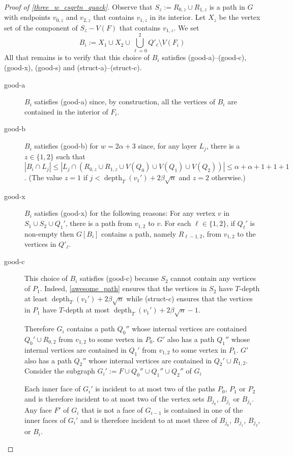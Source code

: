 \documentclass{patmorin}
\DeclareMathOperator{\depth}{depth}
\begin{document}
\begin{proof}[Proof of \cref{three_w_csqrtn_quack}]
  Observe that $S_{z} := R_{0,z}\cup R_{1,z}$ is a path in $G$ with endpoints $v_{0,z}$ and $v_{2,z}$ that contains $v_{1,z}$ in its interior.  Let $X_{z}$ be the vertex set of the component of $S_{z}-V(F)$ that contains $v_{1,z}$.
  We set
  \[
     B_i := X_{1} \cup X_{2} \cup \bigcup_{\ell=0}^2 Q'_\ell\setminus V(F_i)
  \]
  All that remains is to verify that this choice of $B_i$ satisfies (good-a)--(good-c), (good-x), (good-s) and (struct-a)--(struct-c).
  \begin{description}
    \item[good-a] $B_i$ satisfies (good-a) since, by construction, all the vertices of $B_i$ are contained in the interior of $F_i$.

    \item[good-b] $B_i$ satisfies (good-b) for $w=2\alpha+3$ since, for any layer $L_j$, there is a $z\in\{1,2\}$ such that $|B_i\cap L_j|\le |L_j\cap (R_{0,z}\cup R_{1,z}\cup V(Q_0)\cup V(Q_1)\cup V(Q_2))|\le \alpha+\alpha+1+1+1$.  (The value $z=1$ if $j < \depth_T(v_1')+2\beta\sqrt{n}$ and $z=2$ otherwise.)

    \item[good-x] $B_i$ satisfies (good-x) for the following reasons: For any vertex $v$ in $S_1\cup S_2\cup Q_1'$, there is a path from $v_{1,2}$ to $v$.  For each $\ell\in\{1,2\}$, if $Q_\ell'$ is non-empty then $G[B_i]$ contains a path, namely $R_{\ell-1,2}$, from $v_{1,2}$ to the vertices in $Q'_\ell$.

    \item[good-c] This choice of $B_i$ satisfies (good-c) because $S_{2}$ cannot contain any vertices of $P_1$. Indeed, \cref{awesome_path} ensures that the vertices in $S_2$ have $T$-depth at least $\depth_T(v_1')+ 2\beta\sqrt{n}$ while (struct-c) ensures that the vertices in $P_1$ have $T$-depth at most $\depth_T(v_1')+2\beta\sqrt{n}-1$.

    Therefore $G_i$ contains a path $Q_0''$ whose internal vertices are contained $Q_0'\cup R_{0,2}$ from $v_{1,2}$ to some vertex in $P_0$.  $G'$ also has a path $Q_1''$ whose internal vertices are contained in $Q_1'$ from $v_{1,2}$ to some vertex in $P_1$.  $G'$ also has a path $Q_2''$ whose internal vertices are contained in $Q_2'\cup R_{1,2}$.  Consider the subgraph $G_i':=F\cup Q_0''\cup Q_1''\cup Q_2''$ of $G_i$

    Each inner face of $G_i'$ is incident to at most two of the paths $P_0$, $P_1$ or $P_2$ and is therefore incident to at most two of the vertex sets $B_{j_0}$, $B_{j_1}$ or $B_{j_2}$. Any face $F'$ of $G_i$ that is not a face of $G_{i-1}$ is contained in one of the inner faces of $G_i'$ and is therefore incident to at most three of $B_{j_0}$, $B_{j_1}$, $B_{j_2}$, or $B_i$.


\end{description}
\end{proof}
\end{document}

